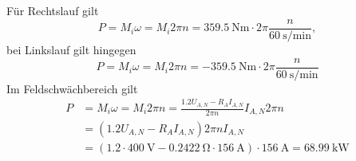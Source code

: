 \documentclass[11pt,a4paper]{scrartcl}
\newcommand{\mybr}[1]{\left(#1\right)}
\newcommand{\0}{_{\mybr{0}}}
\newcommand{\1}{_{\mybr{1}}}
\newcommand{\2}{_{\mybr{2}}}
\begin{document}
\subsection{}
Für Rechtslauf gilt
\begin{equation}
P=M_i\omega=M_i 2\pi n=\SI{359.5}{\newton\metre}\cdot 2\pi \frac{n}{\SI{60}{\second\per\minute}},
\end{equation}
bei Linkslauf gilt hingegen
\begin{equation}
P=M_i\omega=M_i 2\pi n=\SI{-359.5}{\newton\metre}\cdot 2\pi \frac{n}{\SI{60}{\second\per\minute}}
\end{equation}
Im Feldschwächbereich gilt
\begin{align}
P&=M_i\omega=M_i 2\pi n=\frac{\num{1.2}U_{A,N}-R_A I_{A,N}}{2\pi n}I_{A,N}2\pi n\\
&=\mybr{\num{1.2}U_{A,N}-R_A I_{A,N}}{2\pi n}I_{A,N}\\
&=\mybr{\num{1.2}\cdot\SI{400}{\volt}-\SI{0.2422}{\ohm}\cdot\SI{156}{\ampere}}\cdot\SI{156}{\ampere}=\SI{68.99}{\kilo\watt}
\end{align}
\begin{figure*}[!ht]
\centering
{}
\end{figure*}
\end{document}
